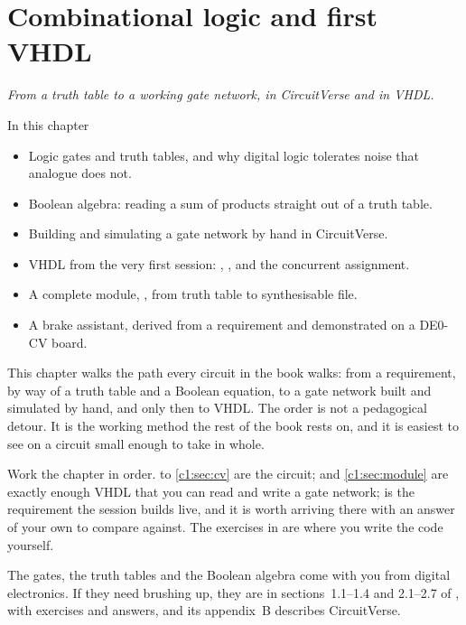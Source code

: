 
\chapter{Combinational logic and first VHDL}
\label{c1:ch}

{\large\itshape From a truth table to a working gate network, in CircuitVerse and in VHDL.\par}

\begin{chapterbox}{In this chapter}
\begin{itemize}
  \item Logic gates and truth tables, and why digital logic tolerates noise that analogue does
    not.
  \item Boolean algebra: reading a sum of products straight out of a truth table.
  \item Building and simulating a gate network by hand in CircuitVerse.
  \item VHDL from the very first session: , ,  and
    the concurrent assignment.
  \item A complete module, , from truth table to synthesisable file.
  \item A brake assistant, derived from a requirement and demonstrated on a DE0-CV board.
\end{itemize}
\end{chapterbox}

This chapter walks the path every circuit in the book walks: from a requirement, by way of a truth
table and a Boolean equation, to a gate network built and simulated by hand, and only then to
VHDL. The order is not a pedagogical detour. It is the working method the rest of the book rests
on, and it is easiest to see on a circuit small enough to take in whole.

Work the chapter in order.  to \ref{c1:sec:cv} are the circuit;
 and \ref{c1:sec:module} are exactly enough VHDL that you can read and write a
gate network;  is the requirement the session builds live, and it is worth
arriving there with an answer of your own to compare against. The exercises in
 are where you write the code yourself.

\note[Refresher] The gates, the truth tables and the Boolean algebra come with you from digital
electronics. If they need brushing up, they are in sections~1.1--1.4 and 2.1--2.7 of \debook{}, with
exercises and answers, and its appendix~B describes CircuitVerse.




